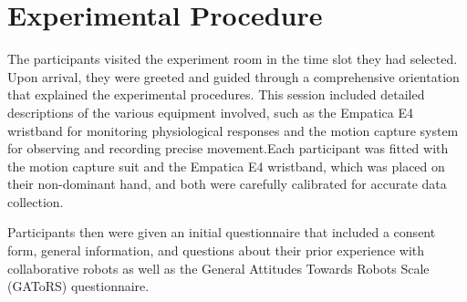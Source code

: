 \section{Experimental Procedure}
The participants visited the experiment room in the time slot they had selected. 
Upon arrival, they were greeted and guided through a comprehensive orientation that explained the experimental procedures. This session included detailed descriptions of the various equipment involved, such as the Empatica E4 wristband for monitoring physiological responses and the motion capture system for observing and recording precise movement.Each participant was fitted with the motion capture suit and the Empatica E4 wristband, which was placed on their non-dominant hand, and both were carefully calibrated for accurate data collection.

Participants then were given an initial questionnaire that included a consent form, general information, and questions about their prior experience with collaborative robots as well as the General Attitudes Towards Robots Scale (GAToRS) questionnaire.

